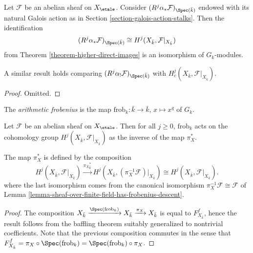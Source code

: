 \begin{lemma}
\label{lemma-two-actions-agree}
Let $\mathcal{F}$ be an abelian sheaf on $X_\etale$. Consider
$(R^j\alpha_*\mathcal{F})_{\Spec(\bar k)}$ endowed with its natural Galois
action as in Section \ref{section-galois-action-stalks}. Then the
identification
$$
(R^j\alpha_*\mathcal{F})_{\Spec(\bar k)} \cong H^j (X_{\bar k},
\mathcal{F}|_{X_{\bar k}})
$$
from Theorem \ref{theorem-higher-direct-images} is an isomorphism of
$G_k$-modules.
\end{lemma}

\noindent
A similar result holds comparing
$(R^j\alpha_!\mathcal{F})_{\Spec(\bar k)}$ with
$H^j_c (X_{\bar k}, \mathcal{F}|_{X_{\bar k}})$.

\begin{proof}
Omitted.
\end{proof}

\begin{definition}
\label{definition-arithmetic-frobenius}
The {\it arithmetic frobenius} is the map
$\text{frob}_k : \bar k \to \bar k$, $x \mapsto x^q$ of $G_k$.
\end{definition}

\begin{theorem}
\label{theorem-geometric-arithmetic-inverse}
Let $\mathcal{F}$ be an abelian sheaf on $X_\etale$. Then for all
$j\geq 0$, $\text{frob}_k$ acts on the cohomology group $H^j(X_{\bar k},
\mathcal{F}|_{X_{\bar k}})$ as the inverse of the map $\pi_X^*$.
\end{theorem}

\noindent
The map $\pi_X^*$ is defined by the composition
$$
H^j(X_{\bar k}, \mathcal{F}|_{X_{\bar k}}) \xrightarrow{{\pi_X}_{\bar k}^*}
H^j(X_{\bar k}, (\pi_X^{-1} \mathcal{F})|_{X_{\bar k}}) \cong
H^j(X_{\bar k}, \mathcal{F}|_{X_{\bar k}}).
$$
where the last isomorphism comes from the canonical isomorphism
$\pi_X^{-1} \mathcal{F} \cong \mathcal{F}$ of
Lemma \ref{lemma-sheaf-over-finite-field-has-frobenius-descent}.

\begin{proof}
The composition $X_{\bar k} \xrightarrow{\Spec(\text{frob}_k)} X_{\bar k}
\xrightarrow{\pi_X} X_{\bar k}$ is equal to $F_{X_{\bar k}}^f$, hence the
result follows from the baffling theorem suitably generalized to nontrivial
coefficients. Note that the previous composition commutes in the sense that
$F_{X_{\bar k}}^f = \pi_X \circ \Spec(\text{frob}_k) =
\Spec(\text{frob}_k) \circ \pi_X$.
\end{proof}

